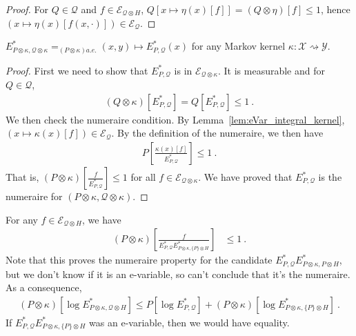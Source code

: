 \begin{proof}
For $Q \in \mathcal{Q}$ and $f \in \mathcal{E}_{\mathcal{Q}\otimes H}$, $Q[x \mapsto \eta(x)[f]] = (Q \otimes \eta)[f] \le 1$, hence $(x \mapsto \eta(x)[f(x, \cdot)]) \in \mathcal{E}_{\mathcal{Q}}$.
\end{proof}


\begin{lemma}\label{lem:numeraire_compProd_same_kernel}
$E^*_{P \otimes \kappa, \mathcal{Q} \otimes \kappa} =_{(P\otimes \kappa) a.e.} (x, y) \mapsto E^*_{P, \mathcal{Q}}(x)$ for any Markov kernel $\kappa : \mathcal{X} \rightsquigarrow \mathcal{Y}$.
\end{lemma}

\begin{proof}
First we need to show that $E^*_{P, \mathcal{Q}}$ is in $\mathcal{E}_{\mathcal{Q} \otimes \kappa}$.
It is measurable and for $Q \in \mathcal{Q}$,
\begin{align*}
  (Q \otimes \kappa)\left[E^*_{P, \mathcal{Q}}\right]
  = Q\left[E^*_{P, \mathcal{Q}}\right]
  \le 1
  \: .
\end{align*}
We then check the numeraire condition.
By Lemma~\ref{lem:eVar_integral_kernel}, $(x \mapsto \kappa(x)[f]) \in \mathcal{E}_{\mathcal{Q}}$.
By the definition of the numeraire, we then have
\begin{align*}
  P\left[\frac{\kappa(x)[f]}{E^*_{P, \mathcal{Q}}}\right]
  \le 1
  \: .
\end{align*}
That is, $(P \otimes \kappa)\left[\frac{f}{E^*_{P, \mathcal{Q}}}\right] \le 1$ for all $f \in \mathcal{E}_{\mathcal{Q}\otimes \kappa}$.
We have proved that $E^*_{P, \mathcal{Q}}$ is the numeraire for $(P \otimes \kappa, \mathcal{Q} \otimes \kappa)$.
\end{proof}


\begin{theorem}\label{thm:numeraire_compProd_le}
For any $f \in \mathcal{E}_{\mathcal{Q} \otimes H}$, we have
\begin{align*}
  (P \otimes \kappa)\left[\frac{f}{E^*_{P, \mathcal{Q}}E^*_{P \otimes \kappa, \{P\} \otimes H}}\right]
  &\le 1
  \: .
\end{align*}
Note that this proves the numeraire property for the candidate $E^*_{P, \mathcal{Q}}E^*_{P \otimes \kappa, P \otimes H}$, but we don't know if it is an e-variable, so can't conclude that it's the numeraire.
As a consequence,
\begin{align*}
  (P \otimes \kappa)\left[\log E^*_{P \otimes \kappa, \mathcal{Q} \otimes H}\right]
  \le P\left[\log E^*_{P, \mathcal{Q}}\right] + (P \otimes \kappa)\left[\log E^*_{P\otimes \kappa, \{P\} \otimes H}\right]
  \: .
\end{align*}
If $E^*_{P, \mathcal{Q}}E^*_{P \otimes \kappa, \{P\} \otimes H}$ was an e-variable, then we would have equality.
\end{theorem}

